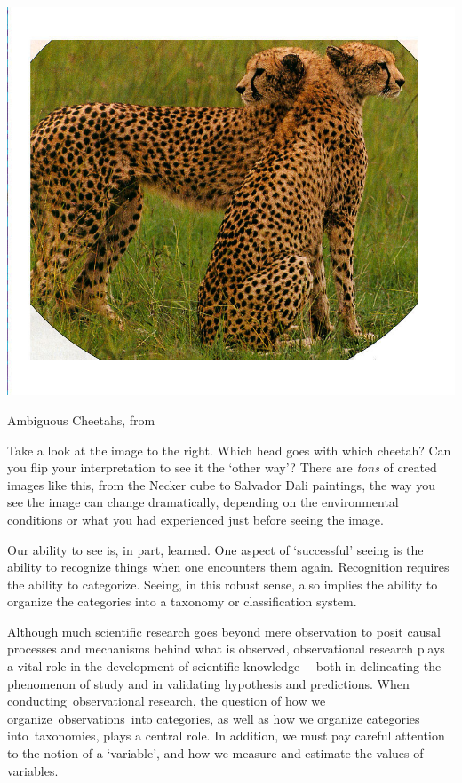 \begin{refsection}
\begin{marginfigure}
\begin{center}
     \includegraphics[scale=0.50]{../images/AmbigCheeta.jpg}
\end{center}
 \caption{Ambiguous Cheetahs, from  ~\citep{Pitts:2007km}}
\label{fig: ambiguouscheetahs}
\end{marginfigure}

Take a look at the image to the right. Which head goes with which cheetah? Can you flip your interpretation to see it the ‘other way’? There are \emph{tons} of created images like this, from the Necker cube to Salvador Dali paintings, the way you see the image can change dramatically, depending on the environmental conditions or what you had experienced just before seeing the image.

Our ability to see is, in part, learned. One aspect of `successful' seeing is the ability to recognize things when one encounters them again. Recognition requires the ability to categorize. Seeing, in this robust sense, also implies the ability to organize the categories into a taxonomy or classification system.

Although much scientific research goes beyond mere observation to posit causal processes and mechanisms behind what is observed, observational research plays a vital role in the development of scientific knowledge— both in delineating the phenomenon of study and in validating hypothesis and predictions. When conducting observational research, the question of how we organize observations into categories, as well as how we organize categories into taxonomies, plays a central role. In addition, we must pay careful attention to the notion of a `variable', and how we measure and estimate the values of variables.


\end{refsection}
